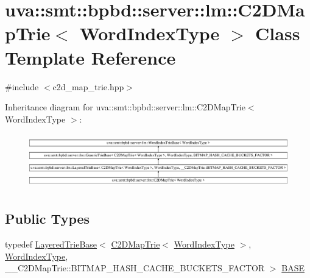 \hypertarget{classuva_1_1smt_1_1bpbd_1_1server_1_1lm_1_1_c2_d_map_trie}{}\section{uva\+:\+:smt\+:\+:bpbd\+:\+:server\+:\+:lm\+:\+:C2\+D\+Map\+Trie$<$ Word\+Index\+Type $>$ Class Template Reference}
\label{classuva_1_1smt_1_1bpbd_1_1server_1_1lm_1_1_c2_d_map_trie}


{\ttfamily \#include $<$c2d\+\_\+map\+\_\+trie.\+hpp$>$}

Inheritance diagram for uva\+:\+:smt\+:\+:bpbd\+:\+:server\+:\+:lm\+:\+:C2\+D\+Map\+Trie$<$ Word\+Index\+Type $>$\+:\begin{figure}[H]
\begin{center}
\leavevmode
\includegraphics[height=2.411195cm]{classuva_1_1smt_1_1bpbd_1_1server_1_1lm_1_1_c2_d_map_trie}
\end{center}
\end{figure}
\subsection*{Public Types}
\begin{DoxyCompactItemize}
\item 
typedef \hyperlink{classuva_1_1smt_1_1bpbd_1_1server_1_1lm_1_1_layered_trie_base}{Layered\+Trie\+Base}$<$ \hyperlink{classuva_1_1smt_1_1bpbd_1_1server_1_1lm_1_1_c2_d_map_trie}{C2\+D\+Map\+Trie}$<$ \hyperlink{classuva_1_1smt_1_1bpbd_1_1server_1_1lm_1_1_word_index_trie_base_a77ee32bf3a9f8a89558bda4f2031200c}{Word\+Index\+Type} $>$, \hyperlink{classuva_1_1smt_1_1bpbd_1_1server_1_1lm_1_1_word_index_trie_base_a77ee32bf3a9f8a89558bda4f2031200c}{Word\+Index\+Type}, \+\_\+\+\_\+\+C2\+D\+Map\+Trie\+::\+B\+I\+T\+M\+A\+P\+\_\+\+H\+A\+S\+H\+\_\+\+C\+A\+C\+H\+E\+\_\+\+B\+U\+C\+K\+E\+T\+S\+\_\+\+F\+A\+C\+T\+O\+R $>$ \hyperlink{classuva_1_1smt_1_1bpbd_1_1server_1_1lm_1_1_c2_d_map_trie_a34e840aa66c6bbf9cc31b8a99738465d}{B\+A\+S\+E}
\end{DoxyCompactItemize}
